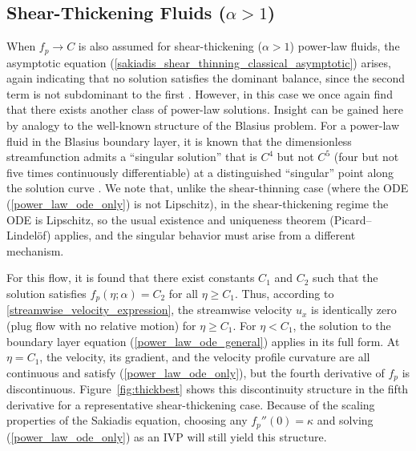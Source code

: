 \documentclass{article}
\begin{document}
\subsection{Shear-Thickening Fluids ($\alpha > 1$)}

\hspace{\parindent} When $f_p \to C$ is also assumed for shear-thickening ($\alpha>1$) power-law fluids, the asymptotic equation (\ref{sakiadis_shear_thinning_classical_asymptotic}) arises, again indicating that no solution satisfies the dominant balance, since the second term is not subdominant to the first \cite{Bender}. However, in this case we once again find that there exists another class of power-law solutions. Insight can be gained here by analogy to the well-known structure of the Blasius problem. For a power-law fluid in the Blasius boundary layer, it is known that the dimensionless streamfunction admits a ``singular solution'' that is $C^4$ but not $C^5$ (four but not five times continuously differentiable) at a distinguished ``singular'' point along the solution curve \cite{Zhizhin1978-us, Pavlov1982-qh}. We note that, unlike the shear-thinning case (where the ODE (\ref{power_law_ode_only}) is not Lipschitz), in the shear-thickening regime the ODE is Lipschitz, so the usual existence and uniqueness theorem (Picard--Lindel\"{o}f) applies, and the singular behavior must arise from a different mechanism.

For this flow, it is found that there exist constants $C_1$ and $C_2$ such that the solution satisfies $f_p(\eta; \alpha) = C_2$ for all $\eta \geq C_1$. Thus, according to \eqref{streamwise_velocity_expression}, the streamwise velocity $u_x$ is identically zero (plug flow with no relative motion) for $\eta \geq C_1$. For $\eta<C_1$, the solution to the boundary layer equation (\ref{power_law_ode_general}) applies in its full form. At $\eta=C_1$, the velocity, its gradient, and the velocity profile curvature are all continuous and satisfy (\ref{power_law_ode_only}), but the fourth derivative of $f_p$ is discontinuous. Figure~\ref{fig:thickbest} shows this discontinuity structure in the fifth derivative for a representative shear-thickening case. Because of the scaling properties of the Sakiadis equation, choosing any $f_p''(0)=\kappa$ and solving (\ref{power_law_ode_only}) as an IVP will still yield this structure.
\end{document}
